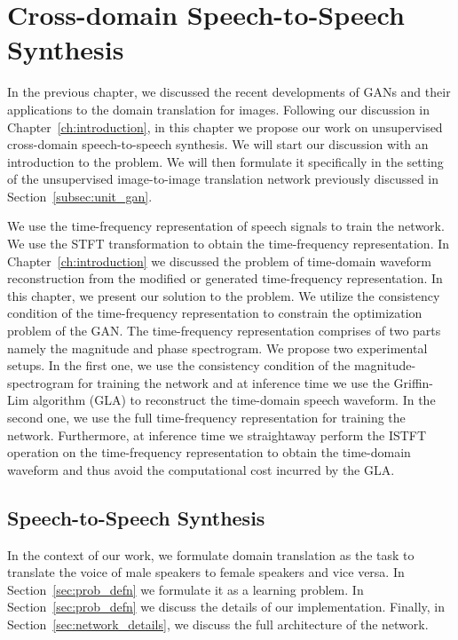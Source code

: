 \chapter{Cross-domain Speech-to-Speech Synthesis}
\label{ch:unvc}
In the previous chapter, we discussed the recent developments of GANs and their applications to the domain translation for images. Following our discussion in Chapter~\ref{ch:introduction}, in this chapter we propose our work on unsupervised cross-domain speech-to-speech synthesis. We will start our discussion with an introduction to the problem. We will then formulate it specifically in the setting of the unsupervised image-to-image translation network previously discussed in Section~\ref{subsec:unit_gan}. 

We use the time-frequency representation of speech signals to train the network. We use the STFT transformation to obtain the time-frequency representation. In Chapter~\ref{ch:introduction} we discussed the problem of time-domain waveform reconstruction from the modified or generated time-frequency representation. In this chapter, we present our solution to the problem. We utilize the consistency condition of the time-frequency representation to constrain the optimization problem of the GAN. The time-frequency representation comprises of two parts namely the magnitude and phase spectrogram. We propose two experimental setups. In the first one, we use the consistency condition of the magnitude-spectrogram for training the network and at inference time we use the Griffin-Lim algorithm (GLA) to reconstruct the time-domain speech waveform. In the second one, we use the full time-frequency representation for training the network. Furthermore, at inference time we straightaway perform the ISTFT operation on the time-frequency representation to obtain the time-domain waveform and thus avoid the computational cost incurred by the GLA.
 
\section{Speech-to-Speech Synthesis}
\label{sec:voice_conv}
In the context of our work, we formulate domain translation as the task to translate the voice of male speakers to female speakers and vice versa. In Section~\ref{sec:prob_defn} we formulate it as a learning problem. In Section~\ref{sec:prob_defn} we discuss the details of our implementation. Finally, in Section~\ref{sec:network_details}, we discuss the full architecture of the network.

